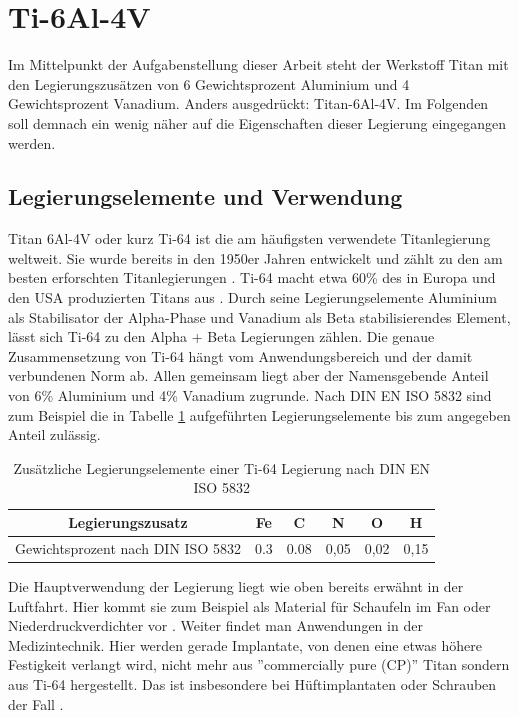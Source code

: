 \documentclass[a4paper, 11pt]{tubsreprt}
\begin{document}
\section{Ti-6Al-4V}\label{Kapitel ti64}
Im Mittelpunkt der Aufgabenstellung dieser Arbeit steht der Werkstoff Titan mit den Legierungszusätzen von 6 Gewichtsprozent Aluminium und 4 Gewichtsprozent Vanadium. Anders ausgedrückt: Titan-6Al-4V. Im Folgenden soll demnach ein wenig näher auf die Eigenschaften dieser Legierung eingegangen werden.  
\subsection{Legierungselemente und Verwendung}
Titan 6Al-4V oder kurz Ti-64 ist die am häufigsten verwendete Titanlegierung weltweit. Sie wurde bereits in den 1950er Jahren entwickelt und zählt zu den am besten erforschten Titanlegierungen \cite{Leyens2002}. Ti-64 macht etwa 60\% des in Europa und den USA produzierten Titans aus \cite{Sieniawski2013}. Durch seine Legierungselemente Aluminium als Stabilisator der Alpha-Phase und Vanadium als Beta stabilisierendes Element, lässt sich Ti-64 zu den Alpha + Beta Legierungen zählen. Die genaue Zusammensetzung von Ti-64 hängt vom Anwendungsbereich und der damit verbundenen Norm ab. Allen gemeinsam liegt aber der Namensgebende Anteil von 6\% Aluminium und 4\% Vanadium zugrunde. Nach DIN EN ISO 5832 sind zum Beispiel die in Tabelle \ref{Tabelle Norm Legierungselemente Ti64} aufgeführten Legierungselemente bis zum angegeben Anteil zulässig.

\begin{table}[t]
\begin{tabular}{c|c|c|c|c|c}
Legierungszusatz & Fe & C & N & O & H \\
\hline
Gewichtsprozent nach DIN ISO 5832 & 0.3 & 0.08 & 0,05 & 0,02 & 0,15 \\
\end{tabular}
\caption{Zusätzliche Legierungselemente einer Ti-64 Legierung nach DIN EN ISO 5832}
\label{Tabelle Norm Legierungselemente Ti64}
\end{table}

Die Hauptverwendung der Legierung liegt wie oben bereits erwähnt in der Luftfahrt. Hier kommt sie zum Beispiel als Material für Schaufeln im Fan oder Niederdruckverdichter vor \cite[vgl. S. 250ff.]{Luetjering2007}. Weiter findet man Anwendungen in der Medizintechnik. Hier werden gerade Implantate, von denen eine etwas höhere Festigkeit verlangt wird, nicht mehr aus ''commercially pure (CP)'' Titan sondern aus Ti-64 hergestellt. Das ist insbesondere bei Hüftimplantaten oder Schrauben der Fall \cite[S. 400 f.]{Luetjering2007}.
\end{document}

